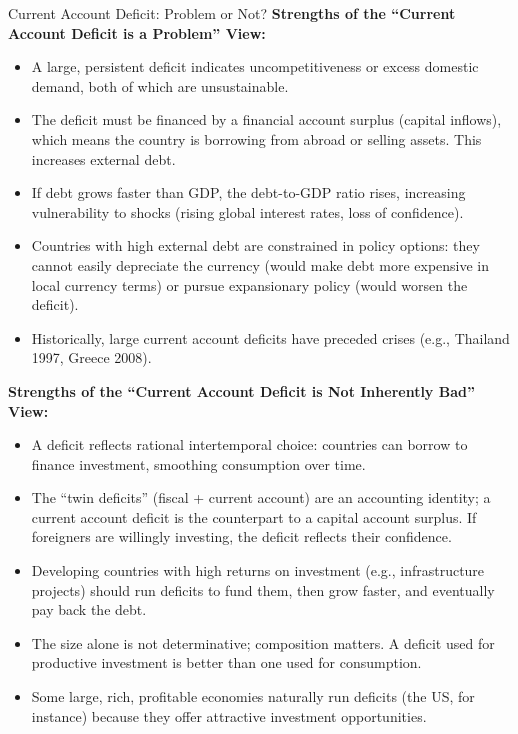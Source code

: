 \documentclass[11pt, a4paper, twoside]{book}
\begin{document}
\begin{evaluation}{Current Account Deficit: Problem or Not?}
\textbf{Strengths of the ``Current Account Deficit is a Problem'' View:}
\begin{itemize}
  \item A large, persistent deficit indicates uncompetitiveness or excess domestic demand, both of which are unsustainable.
  \item The deficit must be financed by a financial account surplus (capital inflows), which means the country is borrowing from abroad or selling assets. This increases external debt.
  \item If debt grows faster than GDP, the debt-to-GDP ratio rises, increasing vulnerability to shocks (rising global interest rates, loss of confidence).
  \item Countries with high external debt are constrained in policy options: they cannot easily depreciate the currency (would make debt more expensive in local currency terms) or pursue expansionary policy (would worsen the deficit).
  \item Historically, large current account deficits have preceded crises (e.g., Thailand 1997, Greece 2008).
\end{itemize}

\textbf{Strengths of the ``Current Account Deficit is Not Inherently Bad'' View:}
\begin{itemize}
  \item A deficit reflects rational intertemporal choice: countries can borrow to finance investment, smoothing consumption over time.
  \item The ``twin deficits'' (fiscal + current account) are an accounting identity; a current account deficit is the counterpart to a capital account surplus. If foreigners are willingly investing, the deficit reflects their confidence.
  \item Developing countries with high returns on investment (e.g., infrastructure projects) should run deficits to fund them, then grow faster, and eventually pay back the debt.
  \item The size alone is not determinative; composition matters. A deficit used for productive investment is better than one used for consumption.
  \item Some large, rich, profitable economies naturally run deficits (the US, for instance) because they offer attractive investment opportunities.
\end{itemize}


\end{evaluation}
\end{document}
